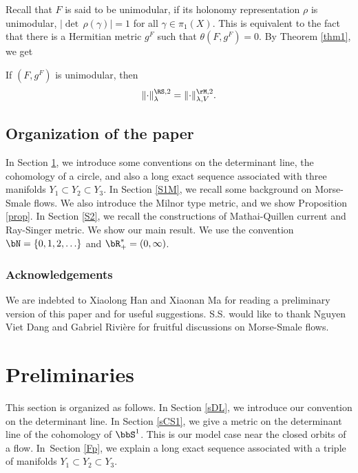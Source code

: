 Recall that $F$ is said to be unimodular, if its holonomy representation
$\rho$ is unimodular, \ie $|{\det\,} \rho(\gamma)|= 1$ for all
$\gamma\in \pi_{1}(X)$. This is
equivalent to the fact that there is a Hermitian metric $g^{F}$
such that $\theta(F,g^{F})=0.$
By Theorem \ref{thm1}, we get
\begin{cor}
If $(F,g^{F})$ is unimodular, then
\begin{equation*}
\|{\cdot}\|^{\RS,2}_{\lambda}=\|{\cdot}\|^{\rM,2}_{\lambda,V}.
\end{equation*}
\end{cor}

\subsection{Organization of the paper}
In Section \ref{Sp1}, we
introduce some conventions on the determinant line, the cohomology
of a circle, and also a long exact sequence associated with three manifolds $Y_{1}\subset Y_{2}\subset Y_{3}$. In Section \ref{S1M}, we recall some background on Morse-Smale
flows. We also introduce the Milnor type metric, and we show Proposition
\ref{prop}. In
Section \ref{S2}, we recall the constructions of Mathai-Quillen
current and Ray-Singer metric. We show our main result.
We use the convention $\bN=\{0,1,2,\ldots\}$ and $\bR_{+}^{*}=(0,\infty)$.

\subsubsection*{Acknowledgements}
We are indebted to Xiaolong Han and Xiaonan Ma for reading a preliminary version of this paper and for useful suggestions. S.S. would like to thank Nguyen Viet Dang and Gabriel Rivière for
fruitful discussions on Morse-Smale flows.

\section{Preliminaries} \label{Sp1}
This section is organized as follows. In Section \ref{sDL}, we
introduce our convention on the determinant line. In Section
\ref{sCS1}, we give a metric on the determinant line of the
cohomology of $\bbS^{1}$. This is our model case near the
closed orbits of a flow. In~Section \ref{Fp}, we explain a long exact
sequence associated with a triple of manifolds $Y_{1}\subset
Y_{2}\subset Y_{3}$.

